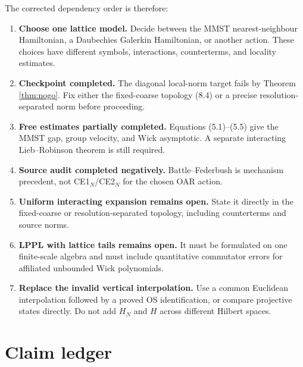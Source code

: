 \documentclass[11pt,a4paper]{article}
\begin{document}
The corrected dependency order is therefore:
\begin{enumerate}[label=\textbf{II.\arabic*.},start=0]
\item \textbf{Choose one lattice model.}  Decide between the MMST nearest-neighbour
Hamiltonian, a Daubechies Galerkin Hamiltonian, or another action.  These choices have
different symbols, interactions, counterterms, and locality estimates.
\item \textbf{Checkpoint completed.}  The diagonal local-norm target fails by Theorem
\ref{thm:nogo}.  Fix either the fixed-coarse topology (8.4) or a precise
resolution-separated norm before proceeding.
\item \textbf{Free estimates partially completed.}  Equations (5.1)--(5.5) give the
MMST gap, group velocity, and Wick asymptotic.  A separate interacting
Lieb--Robinson theorem is still required.
\item \textbf{Source audit completed negatively.}  Battle--Federbush is mechanism
precedent, not CE1$_N$/CE2$_N$ for the chosen OAR action.
\item \textbf{Uniform interacting expansion remains open.}  State it directly in the
fixed-coarse or resolution-separated topology, including counterterms and source norms.
\item \textbf{LPPL with lattice tails remains open.}  It must be formulated on one
finite-scale algebra and must include quantitative commutator errors for affiliated
unbounded Wick polynomials.
\item \textbf{Replace the invalid vertical interpolation.}  Use a common Euclidean
interpolation followed by a proved OS identification, or compare projective states
directly.  Do not add $H_N$ and $H$ across different Hilbert spaces.
\end{enumerate}

\section{Claim ledger}
\end{document}
